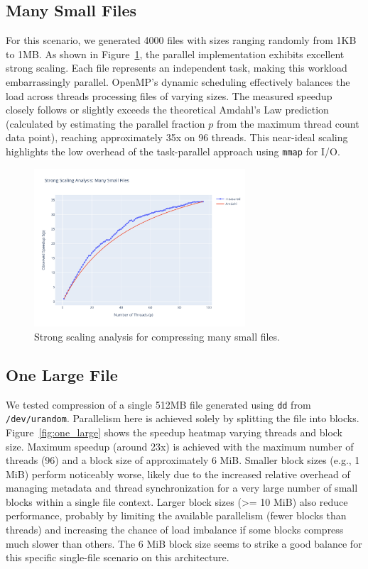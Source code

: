 \documentclass[10pt]{article}
\begin{document}
\subsection*{Many Small Files}
For this scenario, we generated 4000 files with sizes ranging randomly from 1KB to 1MB. As shown in Figure~\ref{fig:many_small}, the parallel implementation exhibits excellent strong scaling. Each file represents an independent task, making this workload embarrassingly parallel. OpenMP's dynamic scheduling effectively balances the load across threads processing files of varying sizes. The measured speedup closely follows or slightly exceeds the theoretical Amdahl's Law prediction (calculated by estimating the parallel fraction $p$ from the maximum thread count data point), reaching approximately 35x on 96 threads. This near-ideal scaling highlights the low overhead of the task-parallel approach using \texttt{mmap} for I/O.

\begin{figure}[hbpt]
    \centering
    \includegraphics[width=0.7\textwidth]{../results/plots/many_small/speedup_many_small.pdf}
    \caption{Strong scaling analysis for compressing many small files.}
    \label{fig:many_small}
\end{figure}

\subsection*{One Large File}
We tested compression of a single 512MB file generated using \texttt{dd} from \texttt{/dev/urandom}. Parallelism here is achieved solely by splitting the file into blocks. Figure~\ref{fig:one_large} shows the speedup heatmap varying threads and block size. Maximum speedup (around 23x) is achieved with the maximum number of threads (96) and a block size of approximately 6 MiB. Smaller block sizes (e.g., 1 MiB) perform noticeably worse, likely due to the increased relative overhead of managing metadata and thread synchronization for a very large number of small blocks within a single file context. Larger block sizes (>= 10 MiB) also reduce performance, probably by limiting the available parallelism (fewer blocks than threads) and increasing the chance of load imbalance if some blocks compress much slower than others. The 6 MiB block size seems to strike a good balance for this specific single-file scenario on this architecture.
\end{document}
